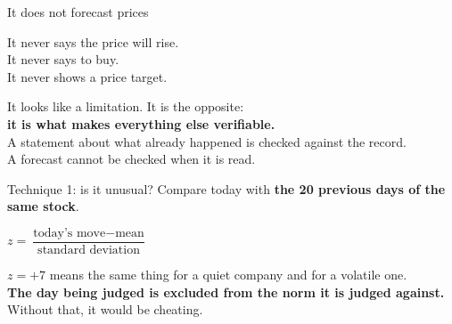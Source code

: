 \documentclass[aspectratio=169]{beamer}
\begin{document}
\begin{frame}{It does not forecast prices}
\begin{center}
\Large
It never says the price will rise.\\[2mm]
It never says to buy.\\[2mm]
It never shows a price target.
\end{center}
\vspace{6mm}
\begin{center}
\normalsize
It looks like a limitation. It is the opposite:\\
\textbf{it is what makes everything else verifiable.}\\[2mm]
\footnotesize A statement about what already happened is checked against the record.\\
A forecast cannot be checked when it is read.
\end{center}
\end{frame}

\begin{frame}{Technique 1: is it unusual?}
Compare today with \textbf{the 20 previous days of the same stock}.
\begin{center}
\end{center}
\vspace{1mm}
\begin{center}
$z = \dfrac{\text{today's move} - \text{mean}}{\text{standard deviation}}$
\end{center}
\vspace{2mm}
\footnotesize
$z=+7$ means the same thing for a quiet company and for a volatile one.\\
\textbf{The day being judged is excluded from the norm it is judged against.} Without that, it would be cheating.
\end{frame}
\end{document}
